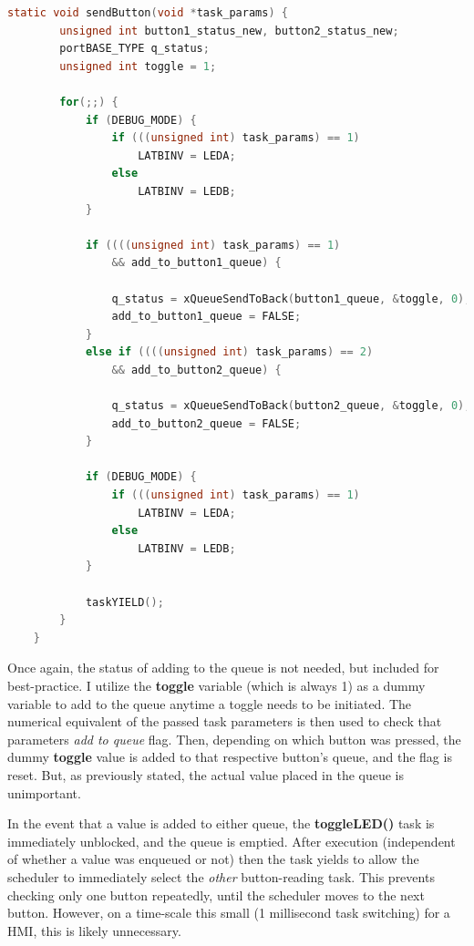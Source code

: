 \documentclass[a4paper, 12pt]{article}
\begin{document}
	\begin{mdframed}[backgroundcolor=code-gray, roundcorner=10pt,
								innerleftmargin=5, innertopmargin=5, innerbottommargin=5]	
	\begin{lstlisting}[language=C, caption=Read Button Task, tabsize=2, label={lst:sendButton}]
	static void sendButton(void *task_params) {
		unsigned int button1_status_new, button2_status_new;
		portBASE_TYPE q_status;
		unsigned int toggle = 1;

		for(;;) {
			if (DEBUG_MODE) {
				if (((unsigned int) task_params) == 1)
					LATBINV = LEDA;
				else
					LATBINV = LEDB;
			}
		
			if ((((unsigned int) task_params) == 1)
				&& add_to_button1_queue) {
				
				q_status = xQueueSendToBack(button1_queue, &toggle, 0);
				add_to_button1_queue = FALSE;
			}
			else if ((((unsigned int) task_params) == 2)
				&& add_to_button2_queue) {
				
				q_status = xQueueSendToBack(button2_queue, &toggle, 0);
				add_to_button2_queue = FALSE;
			}
		
			if (DEBUG_MODE) {
				if (((unsigned int) task_params) == 1)
					LATBINV = LEDA;
				else
					LATBINV = LEDB;
			}
		
			taskYIELD();
		}
	}
	\end{lstlisting}
	\end{mdframed}
	
Once again, the status of adding to the queue is not needed, but included for best-practice. I utilize the \textbf{toggle} variable (which is always 1) as a dummy variable to add to the queue anytime a toggle needs to be initiated. The numerical equivalent of the passed task parameters is then used to check that parameters \emph{add to queue} flag. Then, depending on which button was pressed, the dummy \textbf{toggle} value is added to that respective button's queue, and the flag is reset. But, as previously stated, the actual value placed in the queue is unimportant.

In the event that a value is added to either queue, the \textbf{toggleLED()} task is immediately unblocked, and the queue is emptied. After execution (independent of whether a value was enqueued or not) then the task yields to allow the scheduler to immediately select the \emph{other} button-reading task. This prevents checking only one button repeatedly, until the scheduler moves to the next button. However, on a time-scale this small (1 millisecond task switching) for a HMI, this is likely unnecessary.
 
\end{document}
